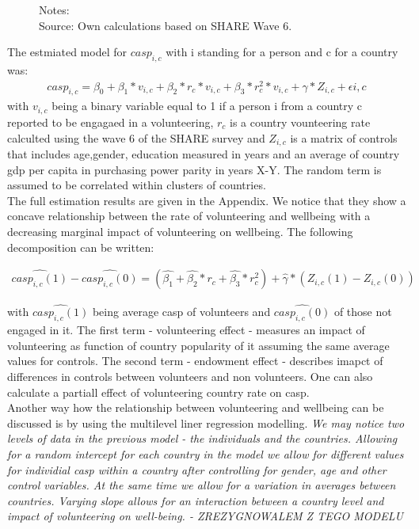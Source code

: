 \documentclass[10pt, letterpaper]{article}
\begin{document}
\begin{spacing}{1.4}
\begin{figure}[H]
\begin{minipage}{1\linewidth}
{\footnotesize Notes: }~\\
{\footnotesize Source: Own calculations based on SHARE Wave 6.}
\end{minipage}
\end{figure} 

The estmiated model for $casp_{i,c}$ with i standing for a person and c for a country was:
 \begin{eqnarray}
	casp_{i,c}= \beta_{0}+ \beta_{1}*v_{i,c} + \beta_{2}*r_{c}*v_{i,c}+\beta_{3}*r^{2}_{c}*v_{i,c}+\gamma*Z_{i,c} + \epsilon{i,c}
 \end{eqnarray}
with $v_{i,c}$ being a binary variable equal to 1 if a person i from a country c reported to be engagaed in a volunteering, $r_{c}$ is a country vounteering rate calculted using the wave 6 of the SHARE survey and $Z_{i,c}$ is a matrix of controls that includes age,gender, education measured in years and an average of country gdp per capita in purchasing power parity in years X-Y. The random term is assumed to be correlated within clusters of countries.  \\
  
The full estimation results are given in the Appendix. We notice that they show a concave relationship between the rate of volunteering and wellbeing with a decreasing marginal impact of volunteering on wellbeing. The following decomposition can be written:

 \begin{eqnarray}
	\hat{casp_{i,c}(1)}-\hat{casp_{i,c}(0)}= (\hat{\beta_{1}}+\hat{\beta_{2}}*r_{c}+\hat{\beta_{3}}*r^{2}_{c})+\hat{\gamma}*(Z_{i,c}(1)-Z_{i,c}(0))
 \end{eqnarray}
       
with $\hat{casp_{i,c}(1)}$ being average casp of volunteers and $  \hat{casp_{i,c}(0)}$ of those not engaged in it. The first term - volunteering effect - measures an impact of volunteering as function of country popularity of it assuming the same average values for controls. The second term - endowment effect - describes imapct of differences in controls between volunteers and non volunteers. One can also calculate a partiall effect of volunteering country rate on casp.  \\   
 
Another way how the relationship between volunteering and wellbeing can be discussed is by using the multilevel liner regression modelling.\textit{ We may notice two levels of data in the previous model - the individuals and the countries. Allowing for a random intercept for each country in the model we allow for different values for individial casp within a country after controlling for gender, age and other control variables. At the same time we allow for a variation in averages between countries.  Varying slope allows for an interaction between a country level and impact of volunteering on well-being. - ZREZYGNOWALEM Z TEGO MODELU } \\



\end{spacing}
\end{document}
